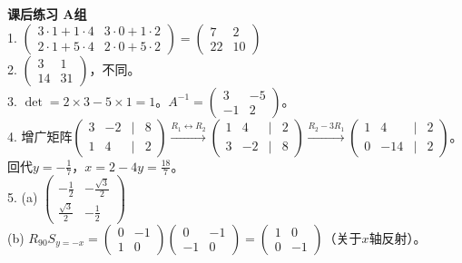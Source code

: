 \noindent\textbf{课后练习 A组}\\
1. $\begin{pmatrix}3\cdot1+1\cdot4&3\cdot0+1\cdot2\\2\cdot1+5\cdot4&2\cdot0+5\cdot2\end{pmatrix}=\begin{pmatrix}7&2\\22&10\end{pmatrix}$\\
2. $\begin{pmatrix}3&1\\14&31\end{pmatrix}$，不同。\\
3. $\det=2\times3-5\times1=1$。$A^{-1}=\begin{pmatrix}3&-5\\-1&2\end{pmatrix}$。\\
4. 增广矩阵$\begin{pmatrix}3&-2&|&8\\1&4&|&2\end{pmatrix}\xrightarrow{R_1\leftrightarrow R_2}\begin{pmatrix}1&4&|&2\\3&-2&|&8\end{pmatrix}\xrightarrow{R_2-3R_1}\begin{pmatrix}1&4&|&2\\0&-14&|&2\end{pmatrix}$。回代$y=-\frac17$，$x=2-4y=\frac{18}{7}$。\\
5. (a) $\begin{pmatrix}-\frac12&-\frac{\sqrt3}{2}\\\frac{\sqrt3}{2}&-\frac12\end{pmatrix}$\\
(b) $R_{90}S_{y=-x}=\begin{pmatrix}0&-1\\1&0\end{pmatrix}\begin{pmatrix}0&-1\\-1&0\end{pmatrix}=\begin{pmatrix}1&0\\0&-1\end{pmatrix}$（关于$x$轴反射）。\\
